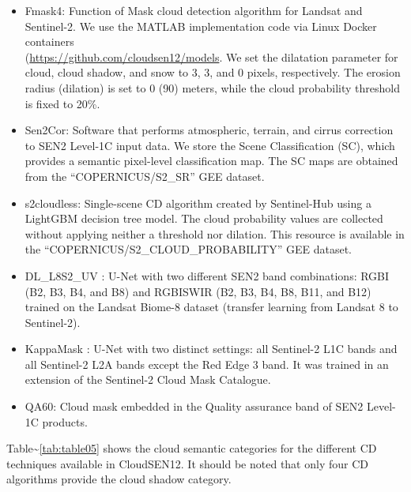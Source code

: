 \documentclass[a4paper, nobind]{templates/cdethesis}
\begin{document}
\begin{itemize}
    \item Fmask4: Function of Mask \cite{Qiu2019} cloud detection algorithm for Landsat and Sentinel-2. We use the MATLAB implementation code via Linux Docker containers \\ (\href{https://github.com/cloudsen12/models}{https://github.com/cloudsen12/models}.  We set the dilatation parameter for cloud, cloud shadow, and snow to 3, 3, and 0 pixels, respectively. The erosion radius (dilation) is set to 0 (90) meters, while the cloud probability threshold is fixed to 20\%.
    
    \item Sen2Cor: Software that performs atmospheric, terrain, and cirrus correction to SEN2 Level-1C input data. We store the Scene Classification (SC), which provides a semantic pixel-level classification map. The SC maps are obtained from the “COPERNICUS/S2\_SR” GEE dataset.
    
    \item s2cloudless: Single-scene CD algorithm created by Sentinel-Hub using a LightGBM decision tree model\cite{Ke2017}. The cloud probability values are collected without applying neither a threshold nor dilation. This resource is available in the “COPERNICUS/S2\_CLOUD\_PROBABILITY” GEE dataset.
    
    \item DL\_L8S2\_UV \cite{Lopez-Puigdollers2021}: U-Net with two different SEN2 band combinations: RGBI (B2, B3, B4, and B8) and RGBISWIR (B2, B3, B4, B8, B11, and B12) trained on the Landsat Biome-8 dataset (transfer learning\cite{MateoGarciaISPRS20,MateoGarciaJSTARS21} from Landsat 8 to Sentinel-2). 
    
    \item KappaMask \cite{Domnich2021}: U-Net with two distinct settings: all Sentinel-2 L1C bands and all Sentinel-2 L2A bands except the Red Edge 3 band. It was trained in an extension of the Sentinel-2 Cloud Mask Catalogue.
    
    \item QA60: Cloud mask embedded in the Quality assurance band of SEN2 Level-1C products.
\end{itemize}

Table\textasciitilde{}\ref{tab:table05} shows the cloud semantic categories for the different CD techniques available in CloudSEN12. It should be noted that only four CD algorithms provide the cloud shadow category.
\end{document}
